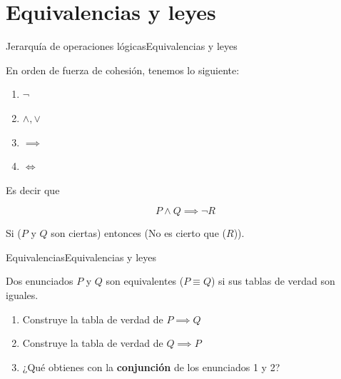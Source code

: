\documentclass[spanish, c]{beamer}
\begin{document}
\section{Equivalencias y leyes}

\begin{frame}{Jerarquía de operaciones lógicas}{Equivalencias y leyes}
    
    En orden de fuerza de cohesión, tenemos lo siguiente:

    \begin{enumerate}[<+->]
        \item $\neg$
        \item $\wedge, \vee$
        \item $\implies$
        \item $\iff$
    \end{enumerate} \pause

    Es decir que

    $$P \wedge Q \implies \neg R$$

    Si ($P$ y $Q$ son ciertas) entonces  (No es cierto que ($R$)).

\end{frame}

\begin{frame}{Equivalencias}{Equivalencias y leyes}

    Dos enunciados $P$ y $Q$ son \alert{equivalentes} ($P \equiv Q$) si sus tablas de verdad son iguales. \pause

    \bigskip

    \begin{enumerate}
        \item Construye la tabla de verdad de $P \implies Q$
        \item Construye la tabla de verdad de $Q \implies P$
        \item ¿Qué obtienes con la \textbf{conjunción} de los enunciados 1 y 2?
    \end{enumerate}

\end{frame}
\end{document}
